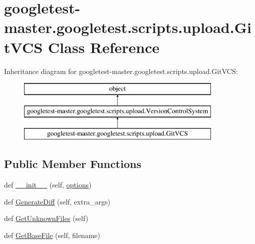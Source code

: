 \hypertarget{classgoogletest-master_1_1googletest_1_1scripts_1_1upload_1_1_git_v_c_s}{}\section{googletest-\/master.googletest.\+scripts.\+upload.\+Git\+V\+CS Class Reference}
\label{classgoogletest-master_1_1googletest_1_1scripts_1_1upload_1_1_git_v_c_s}
Inheritance diagram for googletest-\/master.googletest.\+scripts.\+upload.\+Git\+V\+CS\+:\begin{figure}[H]
\begin{center}
\leavevmode
\includegraphics[height=3.000000cm]{d6/d0c/classgoogletest-master_1_1googletest_1_1scripts_1_1upload_1_1_git_v_c_s}
\end{center}
\end{figure}
\subsection*{Public Member Functions}
\begin{DoxyCompactItemize}
\item 
def \mbox{\hyperlink{classgoogletest-master_1_1googletest_1_1scripts_1_1upload_1_1_git_v_c_s_a3ccc3d3f7f2cbbbfd6b67243bfa71d74}{\+\_\+\+\_\+init\+\_\+\+\_\+}} (self, \mbox{\hyperlink{classgoogletest-master_1_1googletest_1_1scripts_1_1upload_1_1_version_control_system_ad426345e0518e3ca15ca7e9284e45754}{options}})
\item 
def \mbox{\hyperlink{classgoogletest-master_1_1googletest_1_1scripts_1_1upload_1_1_git_v_c_s_a588378267f59aca16c80074bfcb51630}{Generate\+Diff}} (self, extra\+\_\+args)
\item 
def \mbox{\hyperlink{classgoogletest-master_1_1googletest_1_1scripts_1_1upload_1_1_git_v_c_s_afa90a5cfd1b4f217422384f4e1d3b004}{Get\+Unknown\+Files}} (self)
\item 
def \mbox{\hyperlink{classgoogletest-master_1_1googletest_1_1scripts_1_1upload_1_1_git_v_c_s_ae7a966e140897643c1af0b6d946cbb68}{Get\+Base\+File}} (self, filename)
\end{DoxyCompactItemize}
